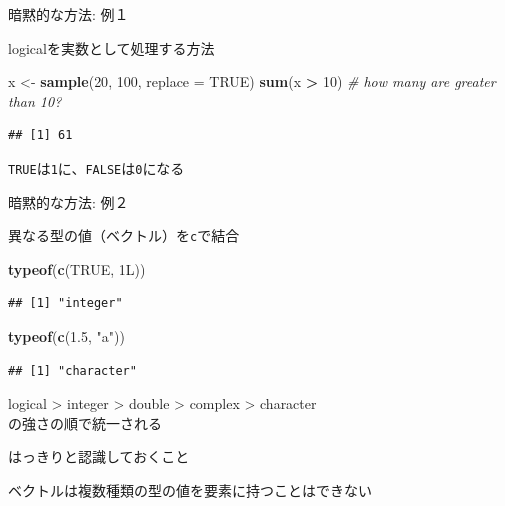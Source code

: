 \documentclass[ignorenonframetext,]{beamer}
\newenvironment{Shaded}{\begin{snugshade}}{\end{snugshade}}
\newcommand{\KeywordTok}[1]{\textcolor[rgb]{0.13,0.29,0.53}{\textbf{#1}}}
\newcommand{\DataTypeTok}[1]{\textcolor[rgb]{0.13,0.29,0.53}{#1}}
\newcommand{\DecValTok}[1]{\textcolor[rgb]{0.00,0.00,0.81}{#1}}
\newcommand{\FloatTok}[1]{\textcolor[rgb]{0.00,0.00,0.81}{#1}}
\newcommand{\StringTok}[1]{\textcolor[rgb]{0.31,0.60,0.02}{#1}}
\newcommand{\CommentTok}[1]{\textcolor[rgb]{0.56,0.35,0.01}{\textit{#1}}}
\newcommand{\OtherTok}[1]{\textcolor[rgb]{0.56,0.35,0.01}{#1}}
\newcommand{\OperatorTok}[1]{\textcolor[rgb]{0.81,0.36,0.00}{\textbf{#1}}}
\newcommand{\NormalTok}[1]{#1}
\begin{document}
\begin{frame}[fragile]{暗黙的な方法: 例１}

logicalを実数として処理する方法

\begin{Shaded}
\begin{Highlighting}[]
\NormalTok{x <-}\StringTok{ }\KeywordTok{sample}\NormalTok{(}\DecValTok{20}\NormalTok{, }\DecValTok{100}\NormalTok{, }\DataTypeTok{replace =} \OtherTok{TRUE}\NormalTok{)}
\KeywordTok{sum}\NormalTok{(x }\OperatorTok{>}\StringTok{ }\DecValTok{10}\NormalTok{)  }\CommentTok{# how many are greater than 10?}
\end{Highlighting}
\end{Shaded}

\begin{verbatim}
## [1] 61
\end{verbatim}

\texttt{TRUE}は\texttt{1}に、\texttt{FALSE}は\texttt{0}になる

\end{frame}

\begin{frame}[fragile]{暗黙的な方法: 例２}

異なる型の値（ベクトル）を\texttt{c}で結合

\begin{Shaded}
\begin{Highlighting}[]
\KeywordTok{typeof}\NormalTok{(}\KeywordTok{c}\NormalTok{(}\OtherTok{TRUE}\NormalTok{, 1L))}
\end{Highlighting}
\end{Shaded}

\begin{verbatim}
## [1] "integer"
\end{verbatim}

\begin{Shaded}
\begin{Highlighting}[]
\KeywordTok{typeof}\NormalTok{(}\KeywordTok{c}\NormalTok{(}\FloatTok{1.5}\NormalTok{, }\StringTok{"a"}\NormalTok{))}
\end{Highlighting}
\end{Shaded}

\begin{verbatim}
## [1] "character"
\end{verbatim}

logical \textgreater{} integer \textgreater{} double \textgreater{}
complex \textgreater{} character\\
の強さの順で統一される

\begin{block}{はっきりと認識しておくこと}

ベクトルは複数種類の型の値を要素に持つことはできない

\end{block}

\end{frame}
\end{document}
